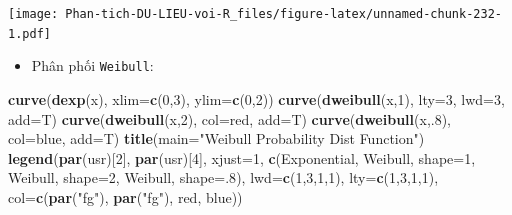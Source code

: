 \documentclass[
]{book}
\newenvironment{Shaded}{\begin{snugshade}}{\end{snugshade}}
\newcommand{\DataTypeTok}[1]{\textcolor[rgb]{0.13,0.29,0.53}{#1}}
\newcommand{\DecValTok}[1]{\textcolor[rgb]{0.00,0.00,0.81}{#1}}
\newcommand{\KeywordTok}[1]{\textcolor[rgb]{0.13,0.29,0.53}{\textbf{#1}}}
\newcommand{\NormalTok}[1]{#1}
\newcommand{\StringTok}[1]{\textcolor[rgb]{0.31,0.60,0.02}{#1}}
\providecommand{\tightlist}{%
  \setlength{\itemsep}{0pt}\setlength{\parskip}{0pt}}
\begin{document}
\texttt{[image: Phan-tich-DU-LIEU-voi-R\_files/figure-latex/unnamed-chunk-232-1.pdf]}

\begin{itemize}
\tightlist
\item
  Phân phối \texttt{Weibull}:
\end{itemize}

\begin{Shaded}
\begin{Highlighting}[]
\KeywordTok{curve}\NormalTok{(}\KeywordTok{dexp}\NormalTok{(x), }\DataTypeTok{xlim=}\KeywordTok{c}\NormalTok{(}\DecValTok{0}\NormalTok{,}\DecValTok{3}\NormalTok{), }\DataTypeTok{ylim=}\KeywordTok{c}\NormalTok{(}\DecValTok{0}\NormalTok{,}\DecValTok{2}\NormalTok{))}
\KeywordTok{curve}\NormalTok{(}\KeywordTok{dweibull}\NormalTok{(x,}\DecValTok{1}\NormalTok{), }\DataTypeTok{lty=}\DecValTok{3}\NormalTok{, }\DataTypeTok{lwd=}\DecValTok{3}\NormalTok{, }\DataTypeTok{add=}\NormalTok{T)}
\KeywordTok{curve}\NormalTok{(}\KeywordTok{dweibull}\NormalTok{(x,}\DecValTok{2}\NormalTok{), }\DataTypeTok{col=}\StringTok{\textquotesingle{}red\textquotesingle{}}\NormalTok{, }\DataTypeTok{add=}\NormalTok{T)}
\KeywordTok{curve}\NormalTok{(}\KeywordTok{dweibull}\NormalTok{(x,.}\DecValTok{8}\NormalTok{), }\DataTypeTok{col=}\StringTok{\textquotesingle{}blue\textquotesingle{}}\NormalTok{, }\DataTypeTok{add=}\NormalTok{T)}
\KeywordTok{title}\NormalTok{(}\DataTypeTok{main=}\StringTok{"Weibull Probability Dist Function"}\NormalTok{)}
\KeywordTok{legend}\NormalTok{(}\KeywordTok{par}\NormalTok{(}\StringTok{\textquotesingle{}usr\textquotesingle{}}\NormalTok{)[}\DecValTok{2}\NormalTok{], }\KeywordTok{par}\NormalTok{(}\StringTok{\textquotesingle{}usr\textquotesingle{}}\NormalTok{)[}\DecValTok{4}\NormalTok{], }\DataTypeTok{xjust=}\DecValTok{1}\NormalTok{,}
        \KeywordTok{c}\NormalTok{(}\StringTok{\textquotesingle{}Exponential\textquotesingle{}}\NormalTok{, }\StringTok{\textquotesingle{}Weibull, shape=1\textquotesingle{}}\NormalTok{,}
          \StringTok{\textquotesingle{}Weibull, shape=2\textquotesingle{}}\NormalTok{, }\StringTok{\textquotesingle{}Weibull, shape=.8\textquotesingle{}}\NormalTok{),}
        \DataTypeTok{lwd=}\KeywordTok{c}\NormalTok{(}\DecValTok{1}\NormalTok{,}\DecValTok{3}\NormalTok{,}\DecValTok{1}\NormalTok{,}\DecValTok{1}\NormalTok{),}
        \DataTypeTok{lty=}\KeywordTok{c}\NormalTok{(}\DecValTok{1}\NormalTok{,}\DecValTok{3}\NormalTok{,}\DecValTok{1}\NormalTok{,}\DecValTok{1}\NormalTok{),}
        \DataTypeTok{col=}\KeywordTok{c}\NormalTok{(}\KeywordTok{par}\NormalTok{(}\StringTok{"fg"}\NormalTok{), }\KeywordTok{par}\NormalTok{(}\StringTok{"fg"}\NormalTok{), }\StringTok{\textquotesingle{}red\textquotesingle{}}\NormalTok{, }\StringTok{\textquotesingle{}blue\textquotesingle{}}\NormalTok{))}
\end{Highlighting}
\end{Shaded}
\end{document}
